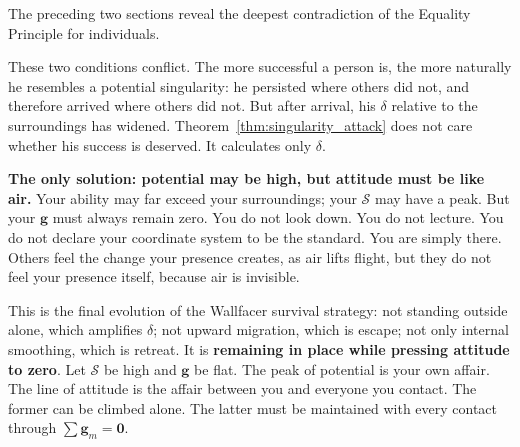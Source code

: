 \documentclass[12pt,a4paper]{article}
\theoremstyle{remark}
\begin{document}
The preceding two sections reveal the deepest contradiction of the Equality Principle for individuals.

\begin{center}
\end{center}

These two conditions conflict. The more successful a person is, the more naturally he resembles a potential singularity: he persisted where others did not, and therefore arrived where others did not. But after arrival, his $\delta$ relative to the surroundings has widened. Theorem~\ref{thm:singularity_attack} does not care whether his success is deserved. It calculates only $\delta$.

\textbf{The only solution: potential may be high, but attitude must be like air.} Your ability may far exceed your surroundings; your $\mathcal{S}$ may have a peak. But your $\mathbf{g}$ must always remain zero. You do not look down. You do not lecture. You do not declare your coordinate system to be the standard. You are simply there. Others feel the change your presence creates, as air lifts flight, but they do not feel your presence itself, because air is invisible.

This is the final evolution of the Wallfacer survival strategy: not standing outside alone, which amplifies $\delta$; not upward migration, which is escape; not only internal smoothing, which is retreat. It is \textbf{remaining in place while pressing attitude to zero}. Let $\mathcal{S}$ be high and $\mathbf{g}$ be flat. The peak of potential is your own affair. The line of attitude is the affair between you and everyone you contact. The former can be climbed alone. The latter must be maintained with every contact through $\sum\mathbf{g}_m = \mathbf{0}$.
\end{document}
